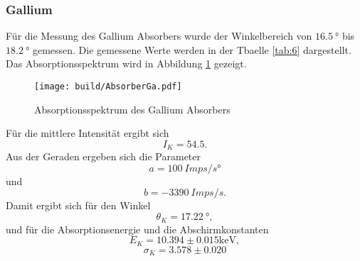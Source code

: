 \subsubsection{Gallium}
Für die Messung des Gallium Absorbers wurde der Winkelbereich von $\qty{16.5}{°}$ bis $\qty{18.2}{°}$ gemessen.
Die gemessene Werte werden in der Tbaelle \ref{tab:6} dargestellt.
Das Absorptionsspektrum wird in Abbildung \ref{fig:AbGa} gezeigt.
\begin{figure}[H]
    \centering
    \texttt{[image: build/AbsorberGa.pdf]}
    \caption{Absorptionsspektrum des Gallium Absorbers}
    \label{fig:AbGa}
\end{figure}
\noindent Für die mittlere Intensität ergibt sich
\begin{equation*}
    I_K = 54.5.
\end{equation*}
Aus der Geraden ergeben sich die Parameter
\begin{equation*}
    a = \qty{100}{Imps/s°}
\end{equation*}
und
\begin{equation*}
    b = \qty{-3390}{Imps/s.}
\end{equation*}
Damit ergibt sich für den Winkel 
\begin{equation*}
    \theta_K = \qty{17.22}{°},
\end{equation*}
und für die Absorptionsenergie und die Abschirmkonstanten
\begin{equation*}
     E_K = 10.394 \pm 0.015 \unit{\kilo\electronvolt},
\end{equation*}
\begin{equation*}
    \sigma_K = 3.578 \pm 0.020
\end{equation*}


